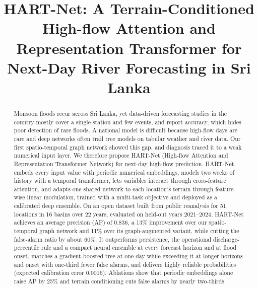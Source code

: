 \documentclass[conference]{IEEEtran}
\newcommand{\model}{HART-Net}
\newif\ifblind
\begin{document}
\title{\model{}: A Terrain-Conditioned High-flow Attention and Representation Transformer for Next-Day River Forecasting in Sri Lanka}

\ifblind
\author{\IEEEauthorblockN{Anonymous Authors}
\IEEEauthorblockA{Affiliation withheld for double-blind review}}
\else
\author{%
}
\fi
\maketitle

\begin{abstract}
Monsoon floods recur across Sri Lanka, yet data-driven forecasting studies in
the country mostly cover a single station and few events, and report accuracy,
which hides poor detection of rare floods. A national model is difficult
because high-flow days are rare and deep networks often trail tree models on
tabular weather and river data. Our first spatio-temporal graph network showed
this gap, and diagnosis traced it to a weak numerical input layer. We therefore
propose \model{} (High-flow Attention and Representation Transformer Network)
for next-day high-flow prediction. \model{} embeds every input value with
periodic numerical embeddings, models two weeks of history with a temporal
transformer, lets variables interact through cross-feature attention, and
adapts one shared network to each location's terrain through feature-wise
linear modulation, trained with a multi-task objective and deployed as a
calibrated deep ensemble. On an open dataset built from public reanalysis for
51 locations in 16 basins over 22 years, evaluated on held-out years
2021--2024, \model{} achieves an average precision (AP) of 0.836, a 13\%
improvement over our spatio-temporal graph network and 11\% over its
graph-augmented variant, while cutting the false-alarm ratio by about 60\%. It
outperforms persistence, the operational discharge-percentile rule and a compact
neural ensemble at every forecast horizon and at flood onset, matches a
gradient-boosted tree at one day while exceeding it at longer horizons and
onset with one-third fewer false alarms, and delivers highly reliable
probabilities (expected calibration error 0.0016). Ablations
show that periodic embeddings alone raise AP by 25\% and terrain conditioning
cuts false alarms by nearly two-thirds.
\end{abstract}
\end{document}
